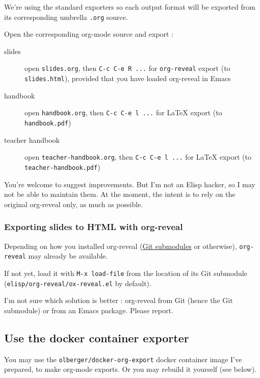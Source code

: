 \documentclass[a4paper]{article}
\begin{document}
We're using the standard exporters so each output format will be exported from its corresponding umbrella \texttt{.org} source.

Open the corresponding org-mode source and export :

\begin{description}
\item[{slides}] open \texttt{slides.org}, then \texttt{C-c C-e R ...} for \texttt{org-reveal} export (to \texttt{slides.html}), provided that you have loaded org-reveal in Emacs
\item[{handbook}] open \texttt{handbook.org}, then \texttt{C-c C-e l ...} for \LaTeX{} export (to \texttt{handbook.pdf})
\item[{teacher handbook}] open \texttt{teacher-handbook.org}, then \texttt{C-c C-e l ...} for \LaTeX{} export (to \texttt{teacher-handbook.pdf})
\end{description}

\begin{NOTES}
You're welcome to suggest improvements. But I'm not an Elisp hacker,
so I may not be able to maintain them. At the moment, the intent is to
rely on the original org-reveal only, as much as possible.
\end{NOTES}

\subsubsection{Exporting slides to HTML with org-reveal}
\label{sec:org271a006}

Depending on how you installed org-reveal (\hyperref[sec:orgc69aa1d]{Git submodules} or otherwise), \texttt{org-reveal} may already be available.

If not yet, load it with \texttt{M-x load-file} from the location of its Git submodule (\texttt{elisp/org-reveal/ox-reveal.el} by default).

\begin{NOTES}
I'm not sure which solution is better : org-reveal from Git (hence the Git submodule) or from an Emacs package. Please report.
\end{NOTES}

\subsection{Use the docker container exporter}
\label{sec:orgf3af923}

You may use the \texttt{olberger/docker-org-export} docker container image
I've prepared, to make org-mode exports. Or you may rebuild it
yourself (see below).
\end{document}
